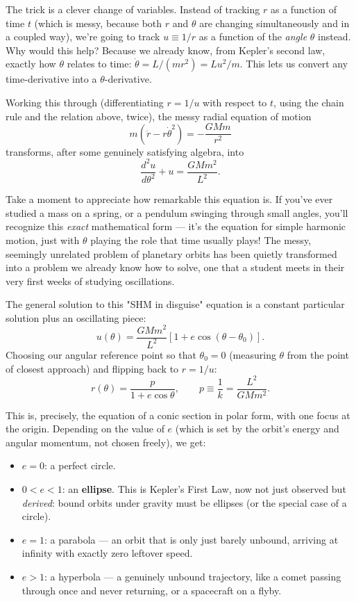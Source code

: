 \documentclass[11pt]{article}
\begin{document}
The trick is a clever change of variables. Instead of tracking $r$ as a function of time $t$
(which is messy, because both $r$ and $\theta$ are changing simultaneously and in a coupled way),
we're going to track $u \equiv 1/r$ as a function of the \emph{angle} $\theta$ instead. Why would
this help? Because we already know, from Kepler's second law, exactly how $\theta$ relates to
time: $\dot\theta = L/(mr^2) = Lu^2/m$. This lets us convert any time-derivative into a
$\theta$-derivative.

Working this through (differentiating $r=1/u$ with respect to $t$, using the chain rule and the
relation above, twice), the messy radial equation of motion
\[
m(\ddot r - r\dot\theta^2) = -\frac{GMm}{r^2}
\]
transforms, after some genuinely satisfying algebra, into
\[
\boxed{\frac{d^2u}{d\theta^2} + u = \frac{GMm^2}{L^2}.}
\]

Take a moment to appreciate how remarkable this equation is. If you've ever studied a mass on a
spring, or a pendulum swinging through small angles, you'll recognize this \emph{exact}
mathematical form --- it's the equation for simple harmonic motion, just with $\theta$ playing the
role that time usually plays! The messy, seemingly unrelated problem of planetary orbits has been
quietly transformed into a problem we already know how to solve, one that a student meets in their
very first weeks of studying oscillations.

The general solution to this "SHM in disguise" equation is a constant particular solution plus an
oscillating piece:
\[
u(\theta) = \frac{GMm^2}{L^2}\left[1+e\cos(\theta-\theta_0)\right].
\]
Choosing our angular reference point so that $\theta_0=0$ (measuring $\theta$ from the point of
closest approach) and flipping back to $r=1/u$:
\[
\boxed{r(\theta) = \frac{p}{1+e\cos\theta}}, \qquad p\equiv\frac1{k}=\frac{L^2}{GMm^2}.
\]

This is, precisely, the equation of a conic section in polar form, with one focus at the origin.
Depending on the value of $e$ (which is set by the orbit's energy and angular momentum, not chosen
freely), we get:
\begin{itemize}
\item $e=0$: a perfect circle.
\item $0<e<1$: an \textbf{ellipse}. This is Kepler's First Law, now not just observed but
\emph{derived}: bound orbits under gravity must be ellipses (or the special case of a circle).
\item $e=1$: a parabola --- an orbit that is only just barely unbound, arriving at infinity with
exactly zero leftover speed.
\item $e>1$: a hyperbola --- a genuinely unbound trajectory, like a comet passing through once and
never returning, or a spacecraft on a flyby.
\end{itemize}
\end{document}

